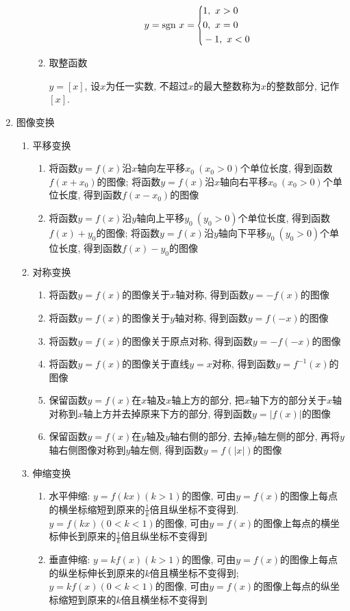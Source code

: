 \begin{enumerate}
\begin{enumerate}
\begin{enumerate}
\begin{equation*}
y=\text{sgn}\ x=
\scaleleftright[6pt]{\biggl\{}{
\begin{aligned}
& 1,\ x>0 \\
& 0,\ x=0 \\
& -1,\ x<0
\end{aligned}
}{.}
\end{equation*}
\item 取整函数\par
$ y=[x] $, 设$ x $为任一实数, 不超过$ x $的最大整数称为$ x $的整数部分, 记作$ [x] $.
\end{enumerate}
\end{enumerate}
\item 图像变换
\begin{enumerate}
\item 平移变换
\begin{enumerate}
\item 将函数$ y=f(x) $沿$ x $轴向左平移$ x_{0}\ (x_{0}>0) $个单位长度, 得到函数$ f(x+x_{0}) $的图像; 将函数$ y=f(x) $沿$ x $轴向右平移$ x_{0}\ (x_{0}>0) $个单位长度, 得到函数$ f(x-x_{0}) $的图像
\item 将函数$ y=f(x) $沿$ y $轴向上平移$ y_{0}\ (y_{0}>0) $个单位长度, 得到函数$ f(x)+y_{0} $的图像; 将函数$ y=f(x) $沿$ y $轴向下平移$ y_{0}\ (y_{0}>0) $个单位长度, 得到函数$ f(x)-y_{0} $的图像
\end{enumerate}
\item 对称变换
\begin{enumerate}
\item 将函数$ y=f(x) $的图像关于$ x $轴对称, 得到函数$ y=-f(x) $的图像
\item 将函数$ y=f(x) $的图像关于$ y $轴对称, 得到函数$ y=f(-x) $的图像
\item 将函数$ y=f(x) $的图像关于原点对称, 得到函数$ y=-f(-x) $的图像
\item 将函数$ y=f(x) $的图像关于直线$ y=x $对称, 得到函数$ y=f^{-1}(x) $的图像
\item 保留函数$ y=f(x) $在$ x $轴及$ x $轴上方的部分, 把$ x $轴下方的部分关于$ x $轴对称到$ x $轴上方并去掉原来下方的部分, 得到函数$ y=|f(x)| $的图像
\item 保留函数$ y=f(x) $在$ y $轴及$ y $轴右侧的部分, 去掉$ y $轴左侧的部分, 再将$ y $轴右侧图像对称到$ y $轴左侧, 得到函数$ y=f(|x|) $的图像
\end{enumerate}
\item 伸缩变换
\begin{enumerate}
\item 水平伸缩: $ y=f(kx)(k>1) $的图像, 可由$ y=f(x) $的图像上每点的横坐标缩短到原来的$ \frac{1}{k} $倍且纵坐标不变得到. $ y=f(kx)(0<k<1) $的图像, 可由$ y=f(x) $的图像上每点的横坐标伸长到原来的$ \frac{1}{k} $倍且纵坐标不变得到
\item 垂直伸缩: $ y=kf(x)(k>1) $的图像, 可由$ y=f(x) $的图像上每点的纵坐标伸长到原来的$ k $倍且横坐标不变得到; $ y=kf(x)(0<k<1) $的图像, 可由$ y=f(x) $的图像上每点的纵坐标缩短到原来的$ k $倍且横坐标不变得到
\end{enumerate}
\end{enumerate}
\end{enumerate}
